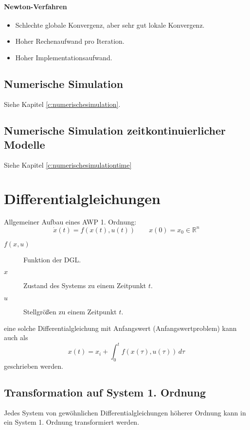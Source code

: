 				\paragraph{Newton-Verfahren}
					\begin{itemize}
						\item Schlechte globale Konvergenz, aber sehr gut lokale Konvergenz.
						\item Hoher Rechenaufwand pro Iteration.
						\item Hoher Implementationsaufwand.
					\end{itemize}

		\subsection{Numerische Simulation} %
			Siehe Kapitel \ref{c:numerischesimulation}.

		\subsection{Numerische Simulation zeitkontinuierlicher Modelle} %
			Siehe Kapitel \ref{c:numerischesimulationtime}

	\section{Differentialgleichungen} %
		Allgemeiner Aufbau eines AWP 1. Ordnung:
		\begin{equation*}
			\dot{x}(t) = f(x(t), u(t)) \quad\quad x(0) = x _ 0 \in \mathbb{R} ^ n
		\end{equation*}
		\begin{description}
			\item[\( f(x, u) \)] Funktion der DGL.
			\item[\( x \)] Zustand des Systems zu einem Zeitpunkt \( t \).
			\item[\( u \)] Stellgrößen zu einem Zeitpunkt \( t \).
		\end{description}

		eine solche Differentialgleichung mit Anfangswert (Anfangswertproblem) kann auch als
		\begin{equation*}
			x(t) = x _ i + \int_{0}^{t} \! f(x(\tau), u(\tau)) \, d\!\tau
		\end{equation*}
		geschrieben werden.

		\subsection{Transformation auf System 1. Ordnung} %
			Jedes System von gewöhnlichen Differentialgleichungen höherer Ordnung kann in ein System 1. Ordnung transformiert werden.

